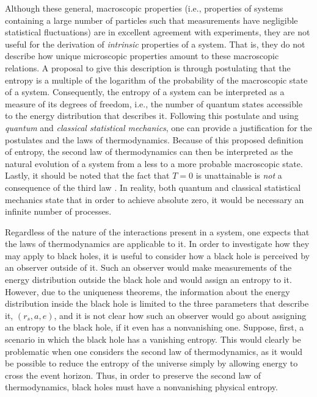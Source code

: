 \documentclass[
12pt,		%
openright,	%
twoside,  %
a4paper,			%
chapter=TITLE,		%
english,			%
french,				%
spanish,			%
brazil				%
]{USPSC-classe/USPSC}
\begin{document}
Although these general, macroscopic properties (i.e., properties of systems containing a large number of particles such that measurements have negligible statistical fluctuations) are in excellent agreement with experiments, they are not useful for the derivation of \textit{intrinsic} properties of a system. That is, they do not describe how unique microscopic properties amount to these macroscopic relations. A proposal to give this description is through postulating that the entropy is a multiple of the logarithm of the probability of the macroscopic state of a system. Consequently, the entropy of a system can be interpreted as a measure of its degrees of freedom, i.e., the number of quantum states accessible to the energy distribution that describes it. Following this postulate and using \textit{quantum} and \textit{classical statistical mechanics}, one can provide a justification for the postulates and the laws of thermodynamics. Because of this proposed definition of entropy, the second law of thermodynamics can then be interpreted as the natural evolution of a system from a less to a more probable macroscopic state. Lastly, it should be noted that the fact that $T=0$ is unattainable is \textit{not} a consequence of the third law \cite{Swendsen2020}. In reality, both quantum and classical statistical mechanics state that in order to achieve absolute zero, it would be necessary an infinite number of processes.

Regardless of the nature of the interactions present in a system, one expects that the laws of thermodynamics are applicable to it. In order to investigate how they may apply to black holes, it is useful to consider how a black hole is perceived by an observer outside of it. Such an observer would make measurements of the energy distribution outside the black hole and would assign an entropy to it. However, due to the uniqueness theorems, the information about the energy distribution inside the black hole is limited to the three parameters that describe it, $(r_s,a,e)$, and it is not clear how such an observer would go about assigning an entropy to the black hole, if it even has a nonvanishing one. Suppose, first, a scenario in which the black hole has a vanishing entropy. This would clearly be problematic when one considers the second law of thermodynamics, as it would be possible to reduce the entropy of the universe simply by allowing energy to cross the event horizon. Thus, in order to preserve the second law of thermodynamics, black holes must have a nonvanishing physical entropy.
\end{document}
